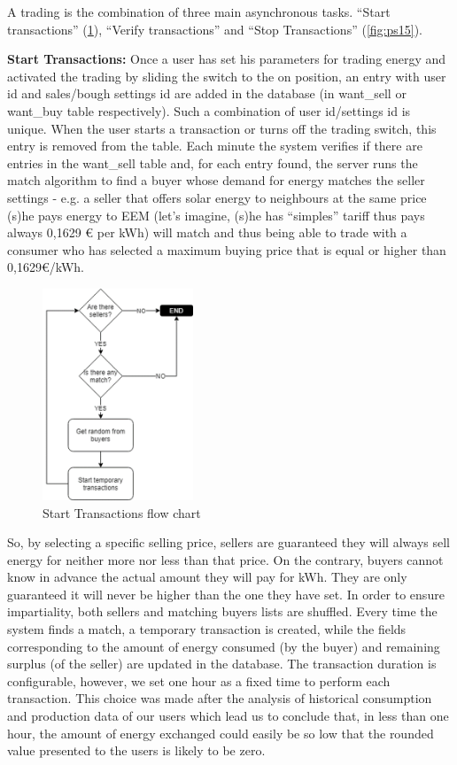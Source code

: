A trading is the combination of three main asynchronous tasks. “Start transactions” (\cref{fig:ps13}), “Verify transactions” and “Stop Transactions” (\cref{fig:ps15}).

\textbf{Start Transactions:} Once a user has set his parameters for trading energy and activated the trading by sliding the switch to the on position, an entry with user id and sales/bough settings id are added in the database (in want\_sell or want\_buy table respectively). Such a combination of user id/settings id is unique. When the user starts a transaction or turns off the trading switch, this entry is removed from the table. Each minute the system verifies if there are entries in the want\_sell table and, for each entry found, the server runs the match algorithm to find a buyer whose demand for energy matches the seller settings - e.g. a seller that offers solar energy to neighbours at the same price (s)he pays energy to \ac{EEM} (let’s imagine, (s)he has “simples” tariff thus pays always 0,1629 € per kWh) will match and thus being able to trade with a consumer who has selected a maximum buying price that is equal or higher than 0,1629€/kWh. 

\begin{figure}[h]
\centering
\includegraphics[width=0.4\textwidth]{./Images/ps13}
\caption{Start Transactions flow chart}
\label{fig:ps13}
\end{figure}

So, by selecting a specific selling price, sellers are guaranteed they will always sell energy for neither more nor less than that price. On the contrary, buyers cannot know in advance the actual amount they will pay for kWh. They are only guaranteed it will never be higher than the one they have set. In order to ensure impartiality, both sellers and matching buyers lists are shuffled. Every time the system finds a match, a temporary transaction is created, while the fields corresponding to the amount of energy consumed (by the buyer)  and remaining surplus (of the seller) are updated in the database. The transaction duration is configurable, however, we set one hour as a fixed time to perform each transaction. This choice was made after the analysis of historical consumption and production data of our users which lead us to conclude that, in less than one hour, the amount of energy exchanged could easily be so low  that the rounded value presented to the users is likely to be zero. 





